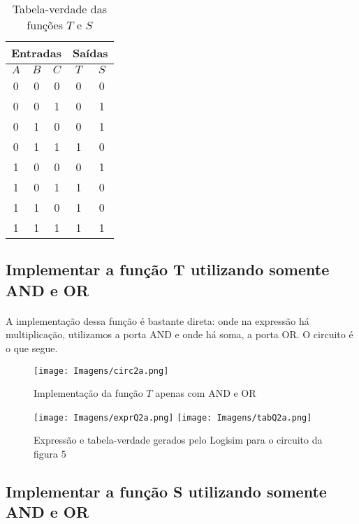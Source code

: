 \documentclass[a4paper, 12pt]{article}
\begin{document}
\begin{table}[H]
    \centering
    \begin{tabular}{|c|c|c|c|c|}
        \hline
        \multicolumn{3}{|c|}{\textbf{Entradas}} & \multicolumn{2}{c|}{\textbf{Saídas}} \\ \hline
        $A$ & $B$ & $C$ & $T$ & $S$ \\ \hline
        0 & 0 & 0 & 0 & 0 \\ \hline
        0 & 0 & 1 & 0 & 1 \\ \hline
        0 & 1 & 0 & 0 & 1 \\ \hline
        0 & 1 & 1 & 1 & 0 \\ \hline
        1 & 0 & 0 & 0 & 1 \\ \hline
        1 & 0 & 1 & 1 & 0 \\ \hline
        1 & 1 & 0 & 1 & 0 \\ \hline
        1 & 1 & 1 & 1 & 1 \\ \hline
    \end{tabular}
    \caption{Tabela-verdade das funções $T$ e $S$}
\end{table}

\subsection{Implementar a função T utilizando somente AND e OR}
\paragraph{}
A implementação dessa função é bastante direta: onde na expressão há multiplicação, utilizamos a porta AND e onde há soma, a porta OR. O circuito é o que segue.

\begin{figure}[H]
    \centering
    \texttt{[image: Imagens/circ2a.png]}
    \caption{Implementação da função $T$ apenas com AND e OR}
\end{figure}

\begin{figure}[H]
    \centering
    \texttt{[image: Imagens/exprQ2a.png]}
    \texttt{[image: Imagens/tabQ2a.png]} \\
    \caption{Expressão e tabela-verdade gerados pelo Logisim para o circuito da figura 5}
\end{figure}

\subsection{Implementar a função S utilizando somente AND e OR}
\end{document}
